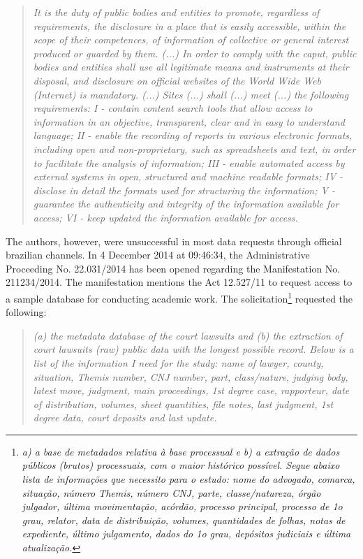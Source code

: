 \documentclass[a4paper]{exam}
\theoremstyle{plain}
\begin{document}
\begin{quote}
\textit{It is the duty of public bodies and entities to promote, regardless of requirements, the disclosure in a place that is easily accessible, within the scope of their competences, of information of collective or general interest produced or guarded by them. (...) In order to comply with the caput, public bodies and entities shall use all legitimate means and instruments at their disposal, and disclosure on official websites of the World Wide Web (Internet) is mandatory. (...) Sites (...) shall (...) meet (...) the following requirements: I - contain content search tools that allow access to information in an objective, transparent, clear and in easy to understand language; II - enable the recording of reports in various electronic formats, including open and non-proprietary, such as spreadsheets and text, in order to facilitate the analysis of information; III - enable automated access by external systems in open, structured and machine readable formats; IV - disclose in detail the formats used for structuring the information; V - guarantee the authenticity and integrity of the information available for access; VI - keep updated the information available for access.} \cite[Article 8]{brasil2011lei}
\end{quote}

The authors, however, were unsuccessful in most data requests through official brazilian channels. In 4 December 2014 at 09:46:34, the Administrative Proceeding No. 22.031/2014 has been opened regarding the Manifestation No. 211234/2014. The manifestation mentions the Act 12.527/11 to request access to a sample database for conducting academic work. The solicitation\footnote{ \textit{a) a base de metadados relativa à base processual e b) a extração de dados públicos (brutos) processuais, com o maior histórico possível. Segue abaixo lista de informações que necessito para o estudo: nome do advogado, comarca, situação, número Themis, número CNJ, parte, classe/natureza, órgão julgador, última movimentação, acórdão, processo principal, processo de 1o grau, relator, data de distribuição, volumes, quantidades de folhas, notas de expediente, último julgamento, dados do 1o grau, depósitos judiciais e última atualização.
}} requested the following:

\begin{quote}
\textit{(a) the metadata database of the court lawsuits and (b) the extraction of court lawsuits (raw) public data with the longest possible record. Below is a list of the information I need for the study: name of lawyer, county, situation, Themis number, CNJ number, part, class/nature, judging body, latest move, judgment, main proceedings, 1st degree case, rapporteur, date of distribution, volumes, sheet quantities, file notes, last judgment, 1st degree data, court deposits and last update.}
\end{quote}
\end{document}
